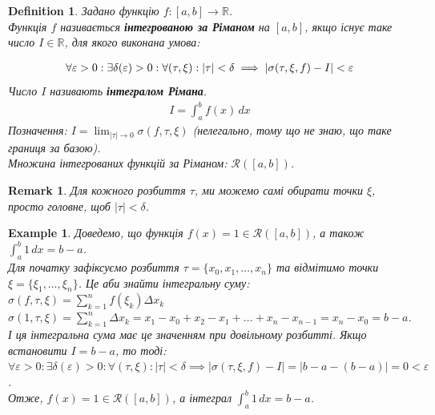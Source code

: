 \documentclass[a4paper, 10pt]{article}
\def\huge{\displaystyle}
\theoremstyle{theoremdd}
\theoremstyle{theoremdd}
\newtheorem{definition}[theorem]{Definition}
\theoremstyle{theoremdd}
\theoremstyle{theoremdd}
\newtheorem{example}[theorem]{Example}
\theoremstyle{theoremdd}
\theoremstyle{theoremdd}
\newtheorem{remark}[theorem]{Remark}
\theoremstyle{theoremdd}
\theoremstyle{theoremdd}
\begin{document}
\begin{definition}
Задано функцію $f: [a,b] \to \mathbb{R}$.\\
Функція $f$ називається \textbf{інтегрованою за Ріманом} на $[a,b]$, якщо існує таке число $I \in \mathbb{R}$, для якого виконана умова:

\begin{align*}
\forall \varepsilon > 0: \exists \delta(\varepsilon) > 0: \forall (\tau, \xi): |\tau| < \delta \implies \abs{\sigma(\tau, \xi, f) - I} < \varepsilon
\end{align*}
Число $I$ називають \textbf{інтегралом Рімана}.
\begin{align*}
I = \int_a^b f(x)\,dx
\end{align*}
Позначення: $I = \huge\lim_{|\tau| \to 0} \sigma(f, \tau, \xi)$ (нелегально, тому що не знаю, що таке границя за базою).\\
Множина інтегрованих функцій за Ріманом: $\mathcal{R}([a,b])$.
\end{definition}

\begin{remark}
Для кожного розбиття $\tau$, ми можемо самі обирати точки $\xi$, просто головне, щоб $|\tau| < \delta$.
\end{remark}

\begin{example}
Доведемо, що функція $f(x) = 1 \in \mathcal{R}([a,b])$, а також $\huge \int_a^b 1\,dx = b-a$.\\
Для початку зафіксуємо розбиття $\tau = \{x_0,x_1,\dots,x_n\}$ та відмітимо точки $\xi = \{\xi_1,\dots,\xi_n\}$. Це аби знайти інтегральну суму:\\
$\sigma (f, \tau, \xi) = \huge \sum_{k=1}^n f(\xi_k) \Delta x_k$\\
$\sigma (1, \tau, \xi) = \huge \sum_{k=1}^n \Delta x_k = x_1 - x_0 + x_2 - x_1 + \dots + x_n - x_{n-1} = x_n - x_0 = b - a$.\\
І ця інтегральна сума має це значенням при довільному розбитті. Якщо встановити $I = b -a$, то тоді:\\
$\forall \varepsilon > 0: \exists \delta(\varepsilon) > 0: \forall (\tau, \xi): |\tau| < \delta \implies |\sigma (\tau, \xi, f) - I| = |b-a - (b-a)| = 0 < \varepsilon$.\\
Отже, $f(x) = 1 \in \mathcal{R}([a,b])$, а інтеграл $\huge \int_a^b 1\,dx = b-a$.
\end{example}
\end{document}
